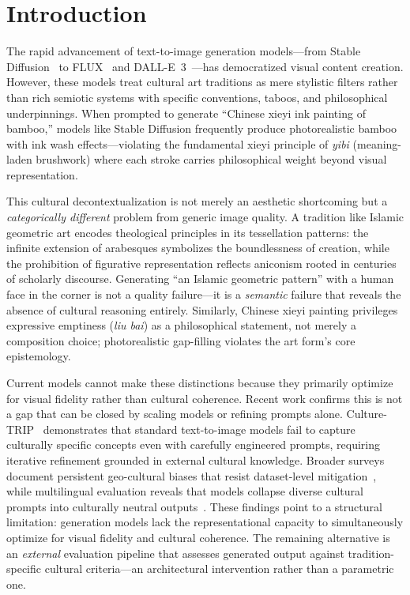 \documentclass[sigconf, screen, review, anonymous]{acmart}
\begin{document}
\maketitle

\section{Introduction}
\label{sec:intro}

The rapid advancement of text-to-image generation models---from Stable Diffusion~\cite{rombach2022high} to FLUX~\cite{flux2024} and DALL-E~3~\cite{dalle3}---has democratized visual content creation.
However, these models treat cultural art traditions as mere stylistic filters rather than rich semiotic systems with specific conventions, taboos, and philosophical underpinnings.
When prompted to generate ``Chinese xieyi ink painting of bamboo,'' models like Stable Diffusion frequently produce photorealistic bamboo with ink wash effects---violating the fundamental xieyi principle of \emph{yibi} (meaning-laden brushwork) where each stroke carries philosophical weight beyond visual representation.

This cultural decontextualization is not merely an aesthetic shortcoming but a \emph{categorically different} problem from generic image quality.
A tradition like Islamic geometric art encodes theological principles in its tessellation patterns: the infinite extension of arabesques symbolizes the boundlessness of creation, while the prohibition of figurative representation reflects aniconism rooted in centuries of scholarly discourse.
Generating ``an Islamic geometric pattern'' with a human face in the corner is not a quality failure---it is a \emph{semantic} failure that reveals the absence of cultural reasoning entirely.
Similarly, Chinese xieyi painting privileges expressive emptiness (\emph{liu bai}) as a philosophical statement, not merely a composition choice; photorealistic gap-filling violates the art form's core epistemology.

Current models cannot make these distinctions because they primarily optimize for visual fidelity rather than cultural coherence.
Recent work confirms this is not a gap that can be closed by scaling models or refining prompts alone.
Culture-TRIP~\cite{jeong2025culturetrip} demonstrates that standard text-to-image models fail to capture culturally specific concepts even with carefully engineered prompts, requiring iterative refinement grounded in external cultural knowledge.
Broader surveys document persistent geo-cultural biases that resist dataset-level mitigation~\cite{wan2024survey}, while multilingual evaluation reveals that models collapse diverse cultural prompts into culturally neutral outputs~\cite{ventura2025cultural, shi2025culture}.
These findings point to a structural limitation: generation models lack the representational capacity to simultaneously optimize for visual fidelity and cultural coherence.
The remaining alternative is an \emph{external} evaluation pipeline that assesses generated output against tradition-specific cultural criteria---an architectural intervention rather than a parametric one.
\end{document}

